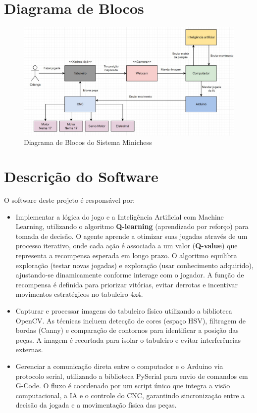 \documentclass[a4paper,12pt]{article}
\begin{document}
\section{Diagrama de Blocos}  
\begin{figure}[H]  
    \centering  
    \includegraphics[width=1.0\textwidth]{images/diagrama.jpeg}   
    \caption{Diagrama de Blocos do Sistema Minichess}  
    \label{fig:diagrama}  
\end{figure}  

\clearpage  
\vspace{1em}  

\section{Descrição do Software}  
O software deste projeto é responsável por:  
\begin{itemize}  
    \item Implementar a lógica do jogo e a Inteligência Artificial com Machine Learning, utilizando o algoritmo \textbf{Q-learning} (aprendizado por reforço) para tomada de decisão. O agente aprende a otimizar suas jogadas através de um processo iterativo, onde cada ação é associada a um valor (\textbf{Q-value}) que representa a recompensa esperada em longo prazo. O algoritmo equilibra exploração (testar novas jogadas) e exploração (usar conhecimento adquirido), ajustando-se dinamicamente conforme interage com o jogador. A função de recompensa é definida para priorizar vitórias, evitar derrotas e incentivar movimentos estratégicos no tabuleiro 4x4.  

    \item Capturar e processar imagens do tabuleiro físico utilizando a biblioteca OpenCV. As técnicas incluem detecção de cores (espaço HSV), filtragem de bordas (Canny) e comparação de contornos para identificar a posição das peças. A imagem é recortada para isolar o tabuleiro e evitar interferências externas.  

    \item Gerenciar a comunicação direta entre o computador e o Arduino via protocolo serial, utilizando a biblioteca PySerial para envio de comandos em G-Code. O fluxo é coordenado por um script único que integra a visão computacional, a IA e o controle do CNC, garantindo sincronização entre a decisão da jogada e a movimentação física das peças.  
\end{itemize}  
\end{document}
